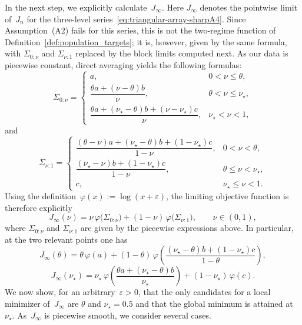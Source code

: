 \documentclass[10pt, letterpaper]{amsart}
\begin{document}
In the next step, we explicitly calculate~$J_\infty$.  Here $J_\infty$ denotes the pointwise limit of~$J_n$ for the three-level series~\eqref{eq:triangular-array-sharpA4}. Since Assumption~(A2) fails for this series, this is not the two-regime function of Definition~\ref{def:population_targets}; it is, however, given by the same formula, with $\Sigma_{0:\nu}$ and $\Sigma_{\nu:1}$ replaced by the block limits computed next.
As our data is piecewise constant, direct averaging yields the following formulas:
\[
\Sigma_{0:\nu}=
\begin{cases}
a, & 0<\nu\le \theta,\\[0.4em]
\dfrac{\theta a+(\nu-\theta)b}{\nu}, & \theta<\nu\le \nu_\star,\\[0.8em]
\dfrac{\theta a+(\nu_\star-\theta)b+(\nu-\nu_\star)c}{\nu}, & \nu_\star<\nu<1,
\end{cases}
\]
and
\[
\Sigma_{\nu:1}=
\begin{cases}
\dfrac{(\theta-\nu)a+(\nu_\star-\theta)b+(1-\nu_\star)c}{1-\nu}, & 0<\nu<\theta,\\[0.8em]
\dfrac{(\nu_\star-\nu)b+(1-\nu_\star)c}{1-\nu}, & \theta\le \nu<\nu_\star,\\[0.8em]
c, & \nu_\star\le \nu<1.
\end{cases}
\]
Using the definition~$\varphi(x):=\log(x+\varepsilon)$, the limiting objective function is therefore explicitly
\begin{equation}\label{eq:Jinfty-explicit-prop18}
J_\infty(\nu)=\nu\,\varphi\!\big(\Sigma_{0:\nu}\big)+(1-\nu)\,\varphi\!\big(\Sigma_{\nu:1}\big),
\qquad \nu\in(0,1),
\end{equation}
where $\Sigma_{0:\nu}$ and $\Sigma_{\nu:1}$ are given by the piecewise expressions above.
In particular, at the two relevant points one has
\[
J_\infty(\theta)=\theta\,\varphi(a)+(1-\theta)\,\varphi\!\left(\frac{(\nu_\star-\theta)b+(1-\nu_\star)c}{1-\theta}\right),
\]
\[
J_\infty(\nu_\star)=\nu_\star\,\varphi\!\left(\frac{\theta a+(\nu_\star-\theta)b}{\nu_\star}\right)
+(1-\nu_\star)\,\varphi(c).
\]
We now show, for an arbitrary~$\varepsilon>0$, that the only candidates for a local minimizer of~$J_\infty$ are $\theta$ and $\nu_\star=0.5$ and that the global minimum is attained at $\nu_\star$. As~$J_\infty$ is piecewise smooth, we consider several cases. \smallskip
\end{document}
